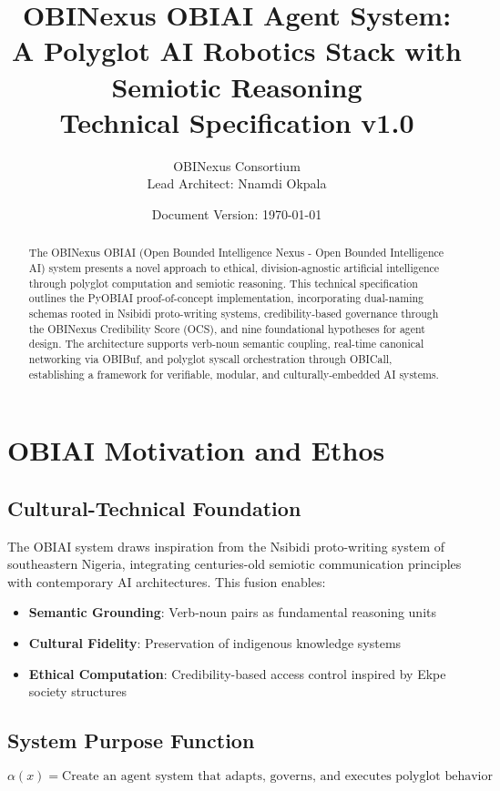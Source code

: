 \documentclass[12pt,a4paper]{article}
\title{OBINexus OBIAI Agent System:\\
A Polyglot AI Robotics Stack with Semiotic Reasoning\\
\large Technical Specification v1.0}
\author{OBINexus Consortium\\
Lead Architect: Nnamdi Okpala}
\date{Document Version: \today}
\begin{document}
\maketitle

\begin{abstract}
The OBINexus OBIAI (Open Bounded Intelligence Nexus - Open Bounded Intelligence AI) system presents a novel approach to ethical, division-agnostic artificial intelligence through polyglot computation and semiotic reasoning. This technical specification outlines the PyOBIAI proof-of-concept implementation, incorporating dual-naming schemas rooted in Nsibidi proto-writing systems, credibility-based governance through the OBINexus Credibility Score (OCS), and nine foundational hypotheses for agent design. The architecture supports verb-noun semantic coupling, real-time canonical networking via OBIBuf, and polyglot syscall orchestration through OBICall, establishing a framework for verifiable, modular, and culturally-embedded AI systems.
\end{abstract}

\tableofcontents
\newpage

\section{OBIAI Motivation and Ethos}

\subsection{Cultural-Technical Foundation}
The OBIAI system draws inspiration from the Nsibidi proto-writing system of southeastern Nigeria, integrating centuries-old semiotic communication principles with contemporary AI architectures. This fusion enables:

\begin{itemize}
    \item \textbf{Semantic Grounding}: Verb-noun pairs as fundamental reasoning units
    \item \textbf{Cultural Fidelity}: Preservation of indigenous knowledge systems
    \item \textbf{Ethical Computation}: Credibility-based access control inspired by Ekpe society structures
\end{itemize}

\subsection{System Purpose Function}
\begin{equation}
\alpha(x) = \text{Create an agent system that adapts, governs, and executes polyglot behavior under OBIAI ethics}
\end{equation}
\end{document}
